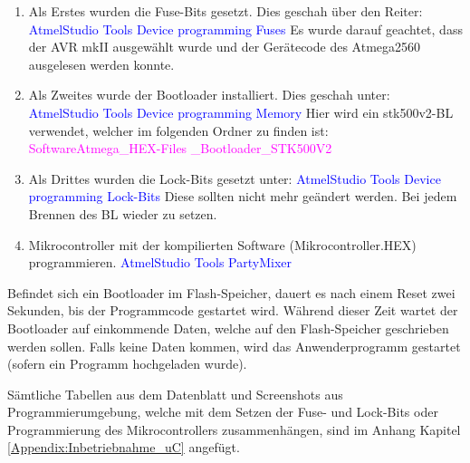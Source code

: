 \begin{enumerate}
\item Als Erstes wurden die Fuse-Bits gesetzt. Dies geschah über den Reiter:\newline
\textcolor{blue}{AtmelStudio \textrightarrow Tools \textrightarrow Device programming \textrightarrow Fuses} \newline
Es wurde darauf geachtet, dass der AVR mkII ausgewählt wurde und der Gerätecode des Atmega2560 ausgelesen werden konnte.\newline

\item Als Zweites wurde der Bootloader installiert. Dies geschah unter:\newline
\textcolor{blue}{AtmelStudio \textrightarrow Tools \textrightarrow Device programming \textrightarrow Memory} \newline
Hier wird ein stk500v2-BL verwendet, welcher im folgenden Ordner zu finden ist:\newline
\textcolor{magenta}{Software\textrightarrow Atmega\_HEX-Files \_Bootloader\_STK500V2}\newline
\item Als Drittes wurden die Lock-Bits gesetzt unter:\newline
\textcolor{blue}{AtmelStudio \textrightarrow Tools \textrightarrow Device programming \textrightarrow Lock-Bits}\newline
Diese sollten nicht mehr geändert werden. Bei jedem Brennen des BL wieder zu setzen.\newline
\item Mikrocontroller mit der kompilierten Software (Mikrocontroller.HEX) programmieren.\newline
\textcolor{blue}{AtmelStudio \textrightarrow Tools \textrightarrow PartyMixer}\newline
\end{enumerate}

Befindet sich ein Bootloader im Flash-Speicher, dauert es nach einem Reset zwei Sekunden, bis der Programmcode gestartet wird. Während dieser Zeit wartet der Bootloader auf einkommende Daten, welche auf den Flash-Speicher geschrieben werden sollen. Falls keine Daten kommen, wird das Anwenderprogramm gestartet (sofern ein Programm hochgeladen wurde).

Sämtliche Tabellen aus dem Datenblatt und Screenshots aus Programmierumgebung, welche mit dem Setzen der Fuse- und Lock-Bits oder Programmierung des Mikrocontrollers zusammenhängen, sind im Anhang Kapitel \ref{Appendix:Inbetriebnahme_uC} angefügt.